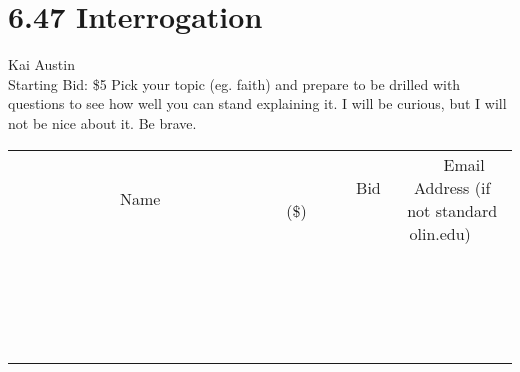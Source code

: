 \documentclass[11pt]{article}
\begin{document}
\section*{6.47 Interrogation}
Kai Austin
\\
Starting Bid: \$5
\newline
Pick your topic (eg. faith) and prepare to be drilled with questions to see how well you can stand explaining it. I will be curious, but I will not be nice about it. Be brave.
\\[3ex]
\begin{tabular}{c c c}
~~~~~~~~~~~~~Name~~~~~~~~~~~~~ & ~~~~~~~~~Bid (\$)~~~~~~~~~  & ~~~Email Address (if not standard olin.edu)~~~\\
 & & \\
\hline
 & & \\
\hline
 & & \\
\hline
 & & \\
\hline
 & & \\
\hline
 & & \\
\hline
 & & \\
\hline
 & & \\
\hline
 & & \\
\hline
 & & \\
\hline
 & & \\
\hline
 & & \\
\hline
 & & \\
\hline
 & & \\
\hline
 & & \\
\hline
 & & \\
\hline
 & & \\
\hline
 & & \\
\hline
 & & \\
\hline
\end{tabular}
\newpage
\end{document}
